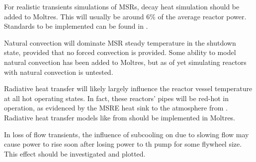 For realistic transients simulations of MSRs, decay heat simulation should be added to Moltres. This will usually be around 6\% of the average reactor power. Standards to be implemented can be found in \cite{decay}.

Natural convection will dominate MSR steady temperature in the shutdown state, provided that no forced convection is provided. Some ability to model natural convection has been added to Moltres, but as of yet simulating reactors with natural convection is untested.

Radiative heat transfer will likely largely influence the reactor vessel temperature at all hot operating states. In fact, these reactors' pipes will be red-hot in operation, as evidenced by the MSRE heat sink to the atmosphere from \cite{robertson_msre}. Radiative heat transfer models like from \cite{schmidt_introduction_1993} should be implemented in Moltres.

In loss of flow transients, the influence of subcooling on due to slowing flow may cause power to rise soon after losing power to th pump for some flywheel size. This effect should be investigated and plotted.

\FloatBarrier





